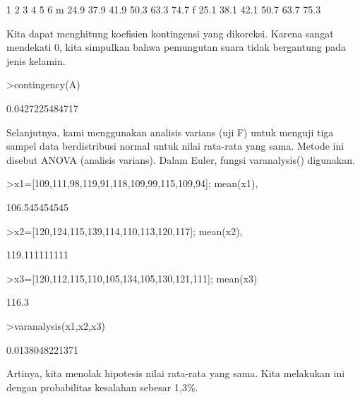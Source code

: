 \documentclass[a4paper,10pt]{article}
\begin{document}
\begin{eulernotebook}
\begin{euleroutput}
             1     2     3     4     5     6
       m  24.9  37.9  41.9  50.3  63.3  74.7
       f  25.1  38.1  42.1  50.7  63.7  75.3
\end{euleroutput}
\begin{eulercomment}
Kita dapat menghitung koefisien kontingensi yang dikoreksi. Karena
sangat mendekati 0, kita simpulkan bahwa pemungutan suara tidak
bergantung pada jenis kelamin.
\end{eulercomment}
\begin{eulerprompt}
>contingency(A)
\end{eulerprompt}
\begin{euleroutput}
  0.0427225484717
\end{euleroutput}
\begin{eulercomment}
Selanjutnya, kami menggunakan analisis varians (uji F) untuk menguji
tiga sampel data berdistribusi normal untuk nilai rata-rata yang sama.
Metode ini disebut ANOVA (analisis varians). Dalam Euler, fungsi
varanalysis() digunakan.
\end{eulercomment}
\begin{eulerprompt}
>x1=[109,111,98,119,91,118,109,99,115,109,94]; mean(x1),
\end{eulerprompt}
\begin{euleroutput}
  106.545454545
\end{euleroutput}
\begin{eulerprompt}
>x2=[120,124,115,139,114,110,113,120,117]; mean(x2),
\end{eulerprompt}
\begin{euleroutput}
  119.111111111
\end{euleroutput}
\begin{eulerprompt}
>x3=[120,112,115,110,105,134,105,130,121,111]; mean(x3)
\end{eulerprompt}
\begin{euleroutput}
  116.3
\end{euleroutput}
\begin{eulerprompt}
>varanalysis(x1,x2,x3)
\end{eulerprompt}
\begin{euleroutput}
  0.0138048221371
\end{euleroutput}
\begin{eulercomment}
Artinya, kita menolak hipotesis nilai rata-rata yang sama. Kita
melakukan ini dengan probabilitas kesalahan sebesar 1,3\%.


\end{eulercomment}
\end{eulernotebook}
\end{document}
